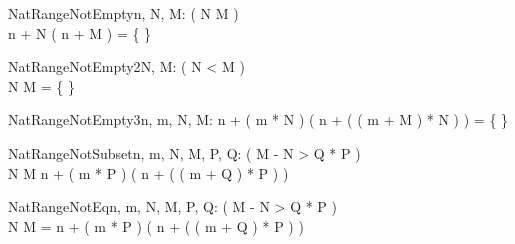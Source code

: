 




\begin{theorem}{NatRangeNotEmpty}{n, \const N, \const M: \nat}
\eval( N \leq M ) \\
n + N \upto ( n + M ) = \{ \}
\end{theorem}

\begin{theorem}{NatRangeNotEmpty2}{\const N, \const M: \nat}
\eval( N < M ) \\
N \upto M = \{ \}
\end{theorem}

\begin{theorem}{NatRangeNotEmpty3}{n, m, \const N, \const M: \nat}
n + ( m * N ) \upto ( n + ( ( m + M ) * N ) ) = \{ \}
\end{theorem}

\begin{theorem}{NatRangeNotSubset}{n, m, \const N, \const M, \const P, \const Q: \nat}
\eval( M - N > Q * P ) \\
N \upto M \subset n + ( m * P ) \upto ( n + ( ( m + Q ) * P ) )
\end{theorem}

\begin{theorem}{NatRangeNotEq}{n, m, \const N, \const M, \const P, \const Q: \nat}
\eval( M - N > Q * P ) \\
N \upto M = n + ( m * P ) \upto ( n + ( ( m + Q ) * P ) )
\end{theorem}

